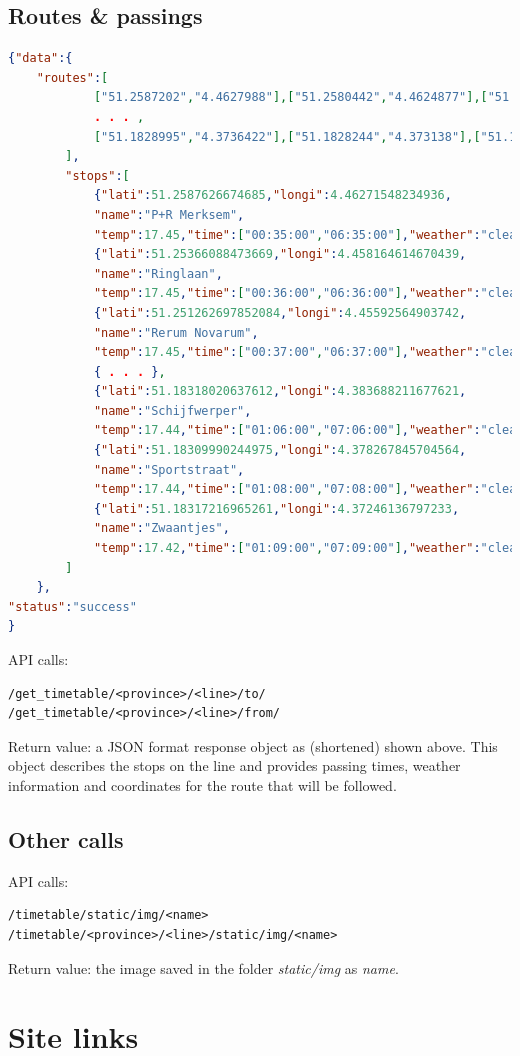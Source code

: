 \documentclass[12pt]{article}
\begin{document}
\subsection{Routes \& passings}
\begin{lstlisting}[language=json]
{"data":{
	"routes":[
			["51.2587202","4.4627988"],["51.2580442","4.4624877"],["51.2560165","4.4605994"],
			. . . ,
			["51.1828995","4.3736422"],["51.1828244","4.373138"],["51.1827684","4.3728861"]
		],
		"stops":[
			{"lati":51.2587626674685,"longi":4.46271548234936,
			"name":"P+R Merksem",
			"temp":17.45,"time":["00:35:00","06:35:00"],"weather":"clear sky"},
			{"lati":51.25366088473669,"longi":4.458164614670439,
			"name":"Ringlaan",
			"temp":17.45,"time":["00:36:00","06:36:00"],"weather":"clear sky"},
			{"lati":51.251262697852084,"longi":4.45592564903742,
			"name":"Rerum Novarum",
			"temp":17.45,"time":["00:37:00","06:37:00"],"weather":"clear sky"},
			{ . . . },
			{"lati":51.18318020637612,"longi":4.383688211677621,
			"name":"Schijfwerper",
			"temp":17.44,"time":["01:06:00","07:06:00"],"weather":"clear sky"},
			{"lati":51.18309990244975,"longi":4.378267845704564,
			"name":"Sportstraat",
			"temp":17.44,"time":["01:08:00","07:08:00"],"weather":"clear sky"},
			{"lati":51.18317216965261,"longi":4.37246136797233,
			"name":"Zwaantjes",
			"temp":17.42,"time":["01:09:00","07:09:00"],"weather":"clear sky"}
		]
	},
"status":"success"
}
\end{lstlisting}
API calls:
\begin{lstlisting}[style=DOS]
/get_timetable/<province>/<line>/to/
/get_timetable/<province>/<line>/from/
\end{lstlisting}
Return value: a JSON format response object as (shortened) shown above. This object describes the stops on the line and provides passing times, weather information and coordinates for the route that will be followed. 

\subsection{Other calls}
API calls:
\begin{lstlisting}[style=DOS]
/timetable/static/img/<name>
/timetable/<province>/<line>/static/img/<name>
\end{lstlisting}
Return value: the image saved in the folder \emph{static/img} as \emph{name}.

\newpage

\section{Site links}
\end{document}
